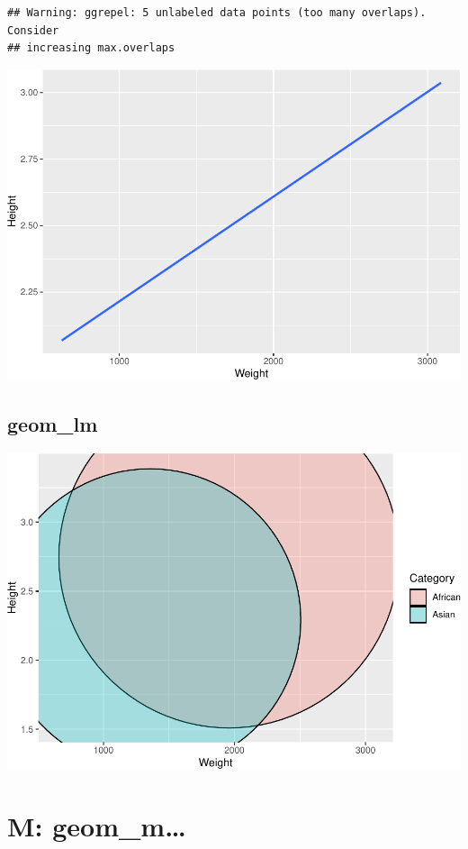 \documentclass[
]{book}
\begin{document}
\begin{verbatim}
## Warning: ggrepel: 5 unlabeled data points (too many overlaps). Consider
## increasing max.overlaps
\end{verbatim}

\includegraphics{Data-Visualisation-geom-Encyclopedia_files/figure-latex/unnamed-chunk-42-1.pdf}

\hypertarget{geom_lm}{%
\section{geom\_lm}\label{geom_lm}}

\includegraphics{Data-Visualisation-geom-Encyclopedia_files/figure-latex/unnamed-chunk-43-1.pdf}

\hypertarget{m-geom_m}{%
\chapter{M: geom\_m\ldots{}}\label{m-geom_m}}
\end{document}
